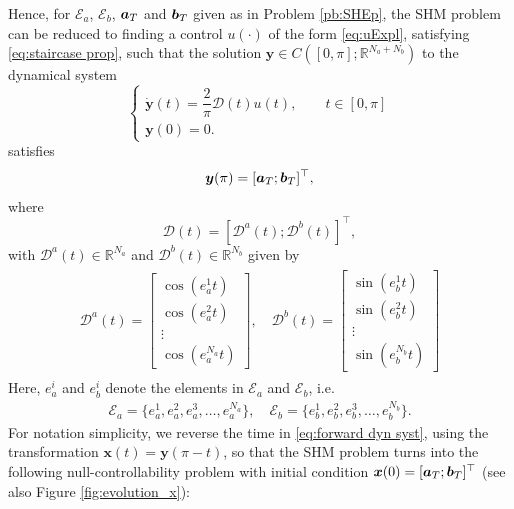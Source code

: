 \documentclass[twocolumn]{autart}    %
\begin{document}
Hence, for $\mathcal{E}_a$, $\mathcal{E}_b$, $\bm{a}_T$ and $\bm{b}_T$ given as in Problem \ref{pb:SHEp}, the SHM problem can be reduced to finding a control $u(\cdot)$ of the form \eqref{eq:uExpl}, satisfying \eqref{eq:staircase prop}, such that the solution $\bm{y} \in C([0,\pi]; \mathbb{R}^{N_a+N_b})$ to the dynamical system
\begin{equation}\label{eq:forward dyn syst}
	\begin{cases}
		\dot{\bm{y}}(t) = \dfrac{2}{\pi} \bm{\mathcal{D}}(t) u(t), \qquad  t\in [0,\pi]
		\\[5pt]
		\bm{y}(0) = 0.
	\end{cases}
\end{equation}
satisfies
\begin{align*}
	\bm{y} (\pi) = [\bm{a}_T;\bm{b}_T]^\top,	
\end{align*}
where
\begin{equation}\label{eq:Dynamics}
	\bm{\mathcal{D}}(t) = \left[ \bm{\mathcal{D}}^a(t); \bm{\mathcal{D}}^b(t) \right]^\top, 
\end{equation}
with $\bm{\mathcal{D}}^a(t) \in \mathbb{R}^{N_a} $ and $ \bm{\mathcal{D}}^b(t) \in \mathbb{R}^{N_b}$ given by
\begin{gather}\label{eq:DalphaDbeta}
    \begin{align}
        \bm{\mathcal{D}}^a(t) = 
        \begin{bmatrix} 
            \cos(e_a^1t) \\ \cos(e_a^2t) \\ \vdots \\ \cos(e_a^{N_a}t) 
        \end{bmatrix},
        \quad \bm{\mathcal{D}}^b(t) = 
        \begin{bmatrix} 
            \sin(e_b^1t) \\ \sin(e_b^2t) \\ \vdots \\ \sin(e_b^{N_b}t)
        \end{bmatrix} 
    \end{align} 
\end{gather}
Here, $e_a^i$ and $e_b^i$  denote the elements in $\mathcal{E}_a$ and  $\mathcal{E}_b$, i.e.
\begin{align*}
	\mathcal{E}_a = \{e_a^1,e_a^2,e_a^3,\dots,e_a^{N_a}\}, \quad \mathcal{E}_b = \{e_b^1,e_b^2,e_b^3,\dots,e_b^{N_b}\}.
\end{align*}
For notation simplicity, we reverse the time in \eqref{eq:forward dyn syst}, using the transformation $\bm{x} (t) = \bm{y}(\pi - t)$, so that the SHM problem turns into the following null-controllability problem with initial condition $\bm{x}(0) = [\bm{a}_T; \bm{b}_T]^\top$ (see also Figure \ref{fig:evolution_x}):
\end{document}

